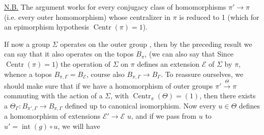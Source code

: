 \uline{N.B.} The argument works for every conjugacy
class of homomorphisms  \(\pi'\longrightarrow\pi\) (i.e. every outer
homomorphism) whose centralizer in \(\pi\) is
reduced to 1 (which for an epimorphism
 hypothesis \(\operatorname{Centr}(\pi)=1\)).

If now a group \(\Sigma\) operates
on the outer group \inserted{\(\pi\)}, then by the
preceding result we can say that it
also operates on the topos \(B_\pi\),  (we can
also say that  Since
\(\operatorname{Centr}(\pi)=1\)) the operation of \deleted{\(\unsure{\pi}\)}\(\Sigma\) on \(\pi\)
defines an extension \(\mathcal E\) of \(\Sigma\) by \(\pi\),
whence a topos \(B_{\pi,\Gamma}=B_{\mathcal E}\),   
course also \(B_{\pi,\Gamma}\longrightarrow B_{\Gamma}\). To reassure
ourselves, we should make sure that
if we have a homomorphism of outer groups
\(\pi'\xrightarrow{\Theta}\pi\) commuting with the action of a
\(\Sigma\), with \(\operatorname{Centr}_\pi(\Theta)=(1)\), then there exists
a \(\Theta_{\Gamma}:B_{\pi',\Gamma}\longrightarrow B_{\pi,\Gamma}\) defined up to canonical
isomorphism. Now every \(u\in\Theta\) defines a
homomorphism of extensions 
\(\mathcal E'\longrightarrow\mathcal E\) 
\(u\), and if we pass from \(u\) to \(u'=\operatorname{int}(g)\circ u\), we will have
